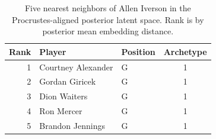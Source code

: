 \begin{table}[htbp]
  \centering\small
  \begin{tabular}{rllc}
    \toprule
    Rank & Player & Position & Archetype \\
    \midrule
    1 & Courtney Alexander & G & 1 \\
    2 & Gordan Giricek & G & 1 \\
    3 & Dion Waiters & G & 1 \\
    4 & Ron Mercer & G & 1 \\
    5 & Brandon Jennings & G & 1 \\
    \bottomrule
  \end{tabular}
  \caption{Five nearest neighbors of Allen Iverson in the Procrustes-aligned posterior latent space. Rank is by posterior mean embedding distance.}
  \label{tab:Allen_Iverson_neighbors}
\end{table}

